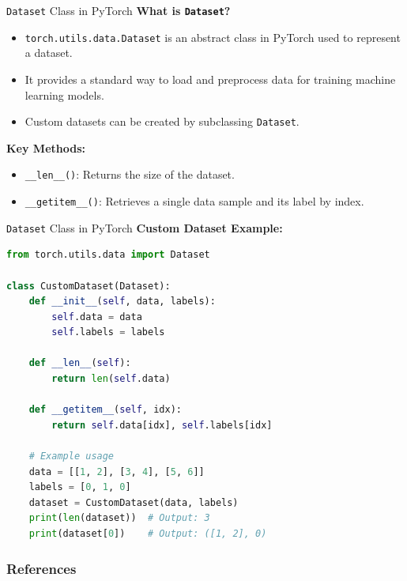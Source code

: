 \documentclass[10pt]{beamer}
\let\olditem\item
\renewcommand\item{\olditem\justifying}
\begin{document}
	
	\begin{frame}{\texttt{Dataset} Class in PyTorch}
		\textbf{What is \texttt{Dataset}?}
		\begin{itemize}
			\item \texttt{torch.utils.data.Dataset} is an abstract class in PyTorch used to represent a dataset.
			\item It provides a standard way to load and preprocess data for training machine learning models.
			\item Custom datasets can be created by subclassing \texttt{Dataset}.
		\end{itemize}
		
		\textbf{Key Methods:}
		\begin{itemize}
			\item \texttt{\_\_len\_\_()}: Returns the size of the dataset.
			\item \texttt{\_\_getitem\_\_()}: Retrieves a single data sample and its label by index.
		\end{itemize}
		
	\end{frame}
	\begin{frame}[fragile]{\texttt{Dataset} Class in PyTorch}
		\textbf{Custom Dataset Example:}
		\begin{lstlisting}[language=Python, caption=Defining a Custom Dataset]
			from torch.utils.data import Dataset
			
class CustomDataset(Dataset):
	def __init__(self, data, labels):
		self.data = data
		self.labels = labels
			
	def __len__(self):
		return len(self.data)
			
	def __getitem__(self, idx):
		return self.data[idx], self.labels[idx]
			
	# Example usage
	data = [[1, 2], [3, 4], [5, 6]]
	labels = [0, 1, 0]
	dataset = CustomDataset(data, labels)
	print(len(dataset))  # Output: 3
	print(dataset[0])    # Output: ([1, 2], 0)
		\end{lstlisting}

	\end{frame}
	
	
	
	
	
	\begin{frame}[allowframebreaks]
		\frametitle{References}
		\printbibliography
	\end{frame}
	
	
\end{document}
